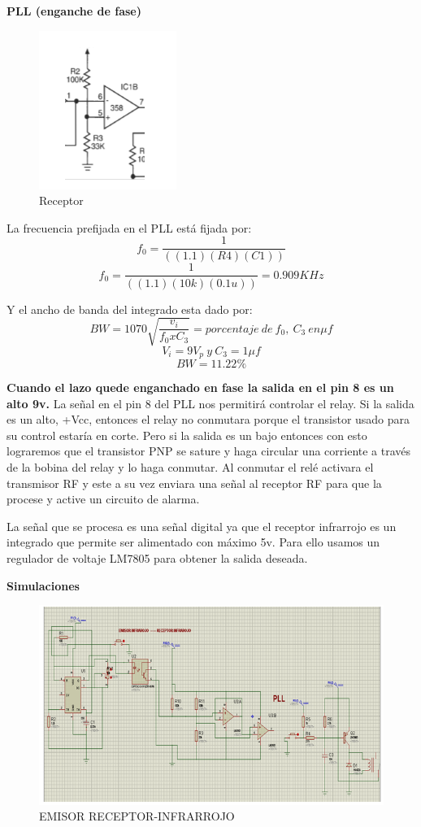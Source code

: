 \documentclass[a4paper,11pt]{article}
\begin{document}
\newpage
\textbf{PLL (enganche de fase)}

\begin{figure}[h]
	\centering
	\includegraphics[width=0.3\linewidth]{./23}
	\caption{Receptor}
\end{figure}

La frecuencia prefijada en el PLL está fijada por:
$$f_0= \frac{1}{((1.1)(R4)(C1))}$$
$$f_0= \frac{1}{((1.1)(10k)(0.1u))} = 0.909KHz$$

Y el ancho de banda del integrado esta dado por:
$$BW = 1070 \sqrt{\frac{v_i}{f_0xC_3}} = porcentaje \ de \ f_0, \ C_3 \ en \mu f $$
$$V_i = 9V_p \ y \ C_3=1\mu f$$
$$BW = 11.22 \%$$

\textbf{Cuando el lazo quede enganchado en fase la salida en el pin 8 es un alto 9v.}
La señal en el pin 8 del PLL nos permitirá controlar el relay. Si la salida es un alto, +Vcc, entonces el relay no conmutara porque el transistor usado para su control estaría en corte. Pero si la salida es un bajo entonces con esto lograremos que el transistor PNP se sature y haga circular  una corriente a través de la bobina del relay y lo haga conmutar.
Al conmutar el relé activara el transmisor RF y este a su vez enviara una señal al receptor RF para que la procese y active un circuito de alarma.


La señal que se procesa es una señal digital ya que el receptor infrarrojo es un integrado que permite ser alimentado con máximo 5v. Para ello usamos un regulador de voltaje LM7805 para obtener la salida deseada.

\newpage
\textbf{Simulaciones}

\begin{figure}[h]
	\caption{EMISOR RECEPTOR-INFRARROJO}
	\centering
	\includegraphics[width=1.1\linewidth]{./25}
\end{figure}
\end{document}
